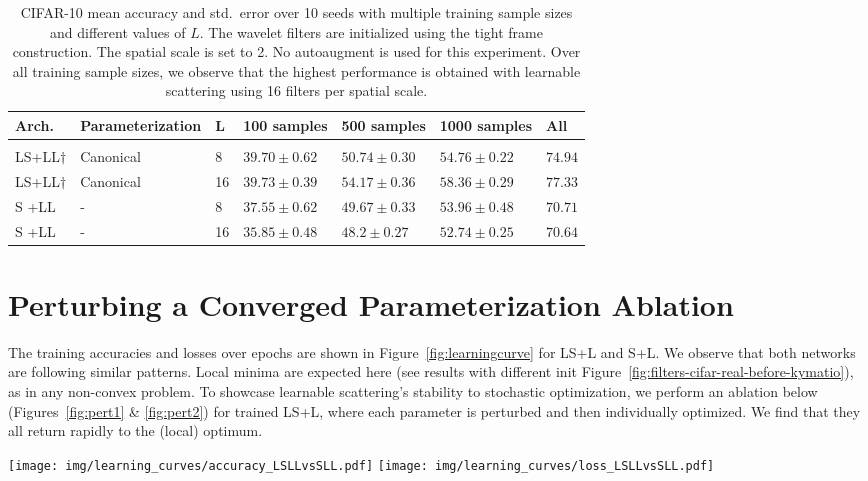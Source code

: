 \documentclass[10pt,twocolumn,letterpaper]{article}
\begin{document}
\begin{table}[H] 
    \centering
    \caption{CIFAR-10 mean accuracy and std.\ error over 10 seeds with multiple training sample sizes and different values of $L$. The wavelet filters are initialized using the tight frame construction. The spatial scale is set to 2. No autoaugment is used for this experiment. Over all training sample sizes, we observe that the highest performance is obtained with learnable scattering using 16 filters per spatial scale. }
    \label{table:Lcompare}
    \fontsize{9}{9}\selectfont 
    \begin{tabularx}{0.75\linewidth}{lllllll} 
          \hline
        Arch. &Parameterization & L & 100 samples &500 samples & 1000 samples & All \\
        \hline
        \\[-2mm]
        LS+LL$\dagger$&Canonical& 8&$39.70\pm0.62$ & $50.74\pm0.30$ 
        &$54.76\pm0.22$&$74.94$\\ 
        LS+LL$\dagger$&Canonical& 16& $39.73\pm0.39$& 
        $\mathbf{54.17}\pm0.36$ &$\mathbf{58.36}\pm0.29$&$\mathbf{77.33}$ \\ 
        S +LL&-&8 &$37.55\pm0.62$ & $49.67\pm0.33$ &$53.96\pm 0.48$&$70.71$ \\
        S +LL&-&16 & $35.85 \pm 0.48$	 & $48.2 \pm 0.27$  & $52.74 \pm 0.25$ &$70.64$ \\
        \hline
    \end{tabularx}
\end{table} 


\section{Perturbing a Converged Parameterization Ablation}

The training accuracies and losses over epochs are shown in Figure~\ref{fig:learningcurve} for LS+L and S+L. We observe that both networks are following similar patterns. Local minima are expected here (see results with different init Figure~\ref{fig:filters-cifar-real-before-kymatio}), as in any non-convex problem. To showcase learnable scattering's stability to stochastic optimization, we perform an ablation below (Figures~\ref{fig:pert1} \& \ref{fig:pert2}) for trained LS+L, where each parameter is perturbed and then individually optimized. We find that they all return rapidly to the (local) optimum.




\begin{figure*}[ht]
    \centering
    \texttt{[image: img/learning\_curves/accuracy\_LSLLvsSLL.pdf]}\qquad
\texttt{[image: img/learning\_curves/loss\_LSLLvsSLL.pdf]} \caption{Plots comparing the training accuracies and losses over epochs of LS+LL and S+LL. Note that scattering parameters are only optimized for LS+LL. The networks were trained for 500 epochs on 1000 samples of CIFAR-10.} \label{fig:learningcurve}
\end{figure*}
\end{document}
